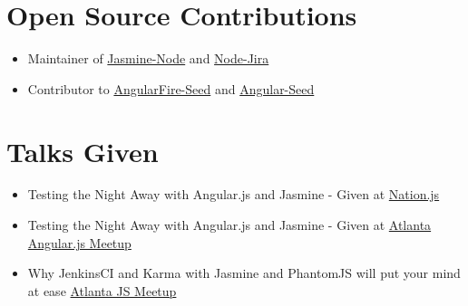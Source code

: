 \documentclass[margin]{res}
\begin{document}
\begin{resume}
\section{Open Source Contributions}
    \begin{itemize}
        \item Maintainer of
            \href{https://github.com/mhevery/jasmine-node}{Jasmine-Node} and
            \href{https://github.com/steves/node-jira}{Node-Jira}
        \item Contributor to
            \href{https://github.com/firebase/angularFire-seed}{AngularFire-Seed}
            and \href{https://github.com/angular/angular-seed}{Angular-Seed}
    \end{itemize}

\section{Talks Given}
    \begin{itemize}
        \item Testing the Night Away with Angular.js and Jasmine - Given at
            \href{http://nationjs.com/}{Nation.js}
        \item Testing the Night Away with Angular.js and Jasmine - Given at
            \href{http://www.meetup.com/AngularJS-ATL/}{Atlanta Angular.js Meetup}
        \item Why JenkinsCI and Karma with Jasmine and PhantomJS will put your
            mind at ease \href{http://www.meetup.com/AtlantaJavaScript/}{Atlanta JS Meetup}
    \end{itemize}

\end{resume}
\end{document}
